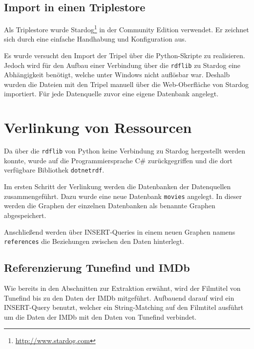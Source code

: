 \documentclass[parskip]{scrartcl}
\begin{document}
\subsection{Import in einen Triplestore}
Als Triplestore wurde Stardog\footnote{\url{http://www.stardog.com}} in der Community Edition verwendet. Er zeichnet sich durch eine einfache Handhabung und Konfiguration aus.

Es wurde versucht den Import der Tripel über die Python-Skripte zu realisieren. Jedoch wird für den Aufbau einer Verbindung über die \texttt{rdflib} zu Stardog eine Abhängigkeit benötigt, welche unter Windows nicht auflösbar war. Deshalb wurden die Dateien mit den Tripel manuell über die Web-Oberfläche von Stardog importiert. Für jede Datenquelle zuvor eine eigene Datenbank angelegt.

\section{Verlinkung von Ressourcen}

Da über die \texttt{rdflib} von Python keine Verbindung zu Stardog hergestellt werden konnte, wurde auf die Programmiersprache C\# zurückgegriffen und die dort verfügbare Bibliothek \texttt{dotnetrdf}.

Im ersten Schritt der Verlinkung werden die Datenbanken der Datenquellen zusammengeführt. Dazu wurde eine neue Datenbank \texttt{movies} angelegt. In dieser werden die Graphen der einzelnen Datenbanken als benannte Graphen abgespeichert.

Anschließend werden über INSERT-Queries in einem neuen Graphen namens \texttt{references} die Beziehungen zwischen den Daten hinterlegt.

\subsection{Referenzierung Tunefind und IMDb}
Wie bereits in den Abschnitten zur Extraktion erwähnt, wird der Filmtitel von Tunefind bis zu den Daten der IMDb mitgeführt. Aufbauend darauf wird ein INSERT-Query benutzt, welcher ein String-Matching auf den Filmtitel ausführt um die Daten der IMDb mit den Daten von Tunefind verbindet.
\end{document}
